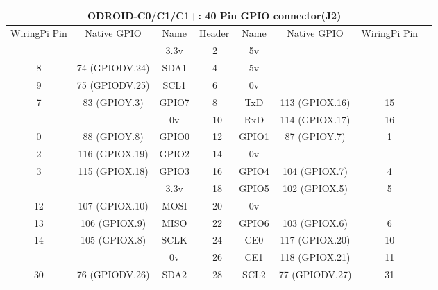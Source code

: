 \documentclass[12pt,a4paper]{article}
\begin{document}
\begin{sffamily}
\begin{center}
\begin{tabular}{|c|c|c||p{8mm}|p{8mm}||c|c|c|c|}
\hline
\multicolumn{8}{|c|}{\bfseries{ODROID-C0/C1/C1+: 40 Pin GPIO connector(J2)}}\\
\hline
\hline
WiringPi Pin	& Native GPIO	& Name	& \multicolumn{2}{|c||}{Header}	& Name	& Native GPIO	& WiringPi Pin\\
\hline
\hline
	& 		& \textcolor{rtb-red}{3.3v}	& \raggedleft{1} &  2 & \textcolor{rtb-maroon}{5v}	& 		& \\
\hline
8	& 74 (GPIODV.24)& \textcolor{rtb-aqua}{SDA1}	& \raggedleft{3} &  4 & \textcolor{rtb-maroon}{5v}	& 		& \\
\hline
9	& 75 (GPIODV.25)& \textcolor{rtb-aqua}{SCL1}	& \raggedleft{5} &  6 & \textcolor{rtb-black}{0v}	& 		& \\
\hline
7	& 83 (GPIOY.3)	& \textcolor{rtb-green}{GPIO7}	& \raggedleft{7} &  8 & \textcolor{rtb-yellow}{TxD}	& 113 (GPIOX.16)& 15\\
\hline
	& 		& \textcolor{rtb-black}{0v}	& \raggedleft{9} & 10 & \textcolor{rtb-yellow}{RxD}	& 114 (GPIOX.17)& 16\\
\hline
0	& 88 (GPIOY.8)	& \textcolor{rtb-green}{GPIO0}	& \raggedleft{11} & 12 & \textcolor{rtb-green}{GPIO1}	& 87 (GPIOY.7)	& 1\\
\hline
2	& 116 (GPIOX.19)& \textcolor{rtb-green}{GPIO2}	& \raggedleft{13} & 14 & \textcolor{rtb-black}{0v}	& 		& \\
\hline
3	& 115 (GPIOX.18)& \textcolor{rtb-green}{GPIO3}	& \raggedleft{15} & 16 & \textcolor{rtb-green}{GPIO4}	& 104 (GPIOX.7)	& 4\\
\hline
	& 		& \textcolor{rtb-red}{3.3v}	& \raggedleft{17} & 18 & \textcolor{rtb-green}{GPIO5}	& 102 (GPIOX.5)	& 5\\
\hline
12	& 107 (GPIOX.10)& \textcolor{rtb-teal}{MOSI}	& \raggedleft{19} & 20 & \textcolor{rtb-black}{0v}	& 		& \\
\hline
13	& 106 (GPIOX.9)	& \textcolor{rtb-teal}{MISO}	& \raggedleft{21} & 22 & \textcolor{rtb-green}{GPIO6}	& 103 (GPIOX.6)	& 6\\
\hline
14	& 105 (GPIOX.8)	& \textcolor{rtb-teal}{SCLK}	& \raggedleft{23} & 24 & \textcolor{rtb-teal}{CE0}	& 117 (GPIOX.20)& 10\\
\hline
	& 		& \textcolor{rtb-black}{0v}	& \raggedleft{25} & 26 & \textcolor{rtb-teal}{CE1}	& 118 (GPIOX.21)& 11\\
\hline
30	& 76 (GPIODV.26)& \textcolor{rtb-green}{SDA2}	& \raggedleft{27} & 28 & \textcolor{rtb-green}{SCL2}	& 77 (GPIODV.27)& 31\\

\end{tabular}
\end{center}
\end{sffamily}
\end{document}
